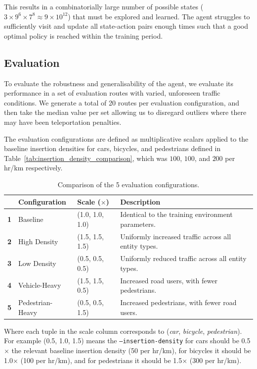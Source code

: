 \documentclass[a4paper]{report}
\begin{document}
This results in a combinatorially large number of possible states ($3\times9^6\times7^8\approx9\times10^{12}$) that must be explored and learned. The agent struggles to sufficiently visit and update all state-action pairs enough times such that a good optimal policy is reached within the training period.

\subsection{Evaluation}

To evaluate the robustness and generalisability of the agent, we evaluate its performance in a set of evaluation routes with varied, unforeseen traffic conditions. We generate a total of 20 routes per evaluation configuration, and then take the median value per set allowing us to disregard outliers where there may have been teleportation penalties.

The evaluation configurations are defined as multiplicative scalars applied to the baseline insertion densities for cars, bicycles, and pedestrians defined in Table~\ref{tab:insertion_density_comparison}, which was $100$, $100$, and $200$ per hr/km respectively.

\begin{table}[H]
  \centering
  \begin{tabular}{c l l l}
    \hline
    & \textbf{Configuration} & \textbf{Scale ($\times$)} & \textbf{Description} \\
    \hline
    \textbf{1} & Baseline & (1.0, 1.0, 1.0) & Identical to the training environment parameters. \\
    \textbf{2} & High Density & (1.5, 1.5, 1.5) & Uniformly increased traffic across all entity types. \\
    \textbf{3} & Low Density & (0.5, 0.5, 0.5) & Uniformly reduced traffic across all entity types. \\
    \textbf{4} & Vehicle-Heavy & (1.5, 1.5, 0.5) & Increased road users, with fewer pedestrians. \\
    \textbf{5} & Pedestrian-Heavy & (0.5, 0.5, 1.5) & Increased pedestrians, with fewer road users. \\
    \hline
  \end{tabular}
  \caption{Comparison of the 5 evaluation configurations.}
  \label{tab:evaluation_configs}
\end{table}

Where each tuple in the scale column corresponds to (\emph{car}, \emph{bicycle}, \emph{pedestrian}). For example (0.5, 1.0, 1.5) means the \texttt{--insertion-density} for cars should be 0.5$\times$ the relevant baseline insertion density (50 per hr/km), for bicycles it should be 1.0$\times$ (100 per hr/km), and for pedestrians it should be 1.5$\times$ (300 per hr/km).
\end{document}
